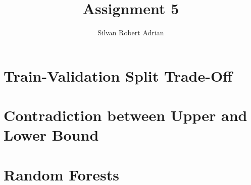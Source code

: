 \documentclass[12pt,a4paper]{article}
\title{\vspace{-5cm} Assignment 5}
\author{Silvan Robert Adrian}
\begin{document}
\maketitle

\tableofcontents

\section{Train-Validation Split Trade-Off}


\section{Contradiction between Upper and Lower Bound}


\section{Random Forests}

\end{document}
